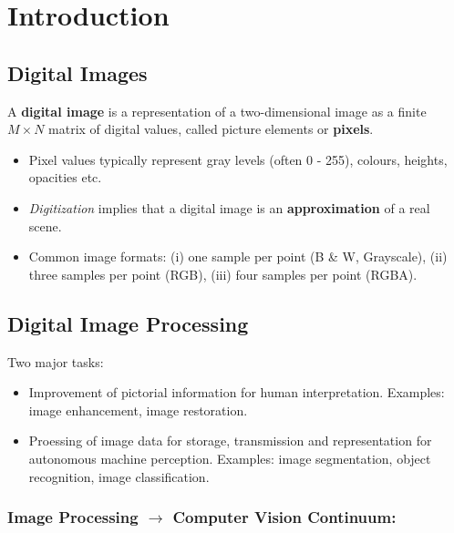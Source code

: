 \section*{Introduction}

\subsection*{Digital Images}

A \textbf{digital image} is a representation of a two-dimensional image as a finite $M \times N$ matrix of digital values, called picture elements or \textbf{pixels}.

\begin{itemize}
  \item Pixel values typically represent gray levels (often 0 - 255), colours, heights, opacities etc.
  \item \textit{Digitization} implies that a digital image is an \textbf{approximation} of a real scene.
  \item Common image formats: (i) one sample per point (B \& W, Grayscale), (ii) three samples per point (RGB), (iii) four samples per point (RGBA).
\end{itemize}

\subsection*{Digital Image Processing}

Two major tasks:

\begin{itemize}
  \item Improvement of pictorial information for human interpretation. Examples: image enhancement, image restoration.
  \item Proessing of image data for storage, transmission and representation for autonomous machine perception. Examples: image segmentation, object recognition, image classification.
\end{itemize}

\subsubsection*{Image Processing $\rightarrow$ Computer Vision Continuum:}


